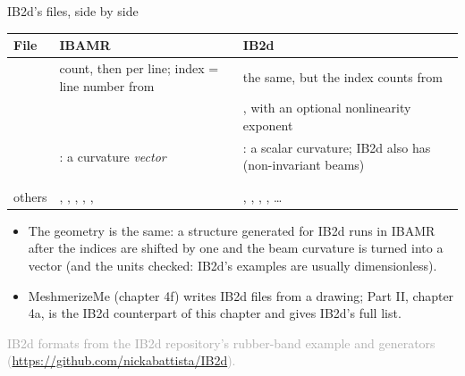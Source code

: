 \documentclass[aspectratio=169,11pt]{beamer}
\newcommand{\sourcecredit}[1]{\vfill\hfill{\tiny\textcolor{DarkGray}{#1}}}
\begin{document}
\begin{frame}{IB2d's files, side by side}
\scriptsize
\begin{tabular}{@{}L{0.09\textwidth}L{0.38\textwidth}L{0.42\textwidth}@{}}
\toprule
File & IBAMR & IB2d\\
\midrule
{} & count, then  per line; index = line number from  & the same, but the index counts from \\
 &  & , with an optional nonlinearity exponent \\
 & : a curvature \emph{vector} & : a scalar curvature; IB2d also has  (non-invariant beams)\\
 &  & \\
 &  & \\
others & , , , , ,  & , , , , \ldots\\
\bottomrule
\end{tabular}
\vspace{2mm}
\small
\begin{itemize}
  \item The geometry is the same: a structure generated for IB2d runs in IBAMR after the indices are shifted by one and the beam curvature is turned into a vector (and the units checked: IB2d's examples are usually dimensionless).
  \item MeshmerizeMe (chapter 4f) writes IB2d files from a drawing; Part II, chapter 4a, is the IB2d counterpart of this chapter and gives IB2d's full list.
\end{itemize}
\sourcecredit{IB2d formats from the IB2d repository's rubber-band example and generators (\url{https://github.com/nickabattista/IB2d}).}
\end{frame}
\end{document}

